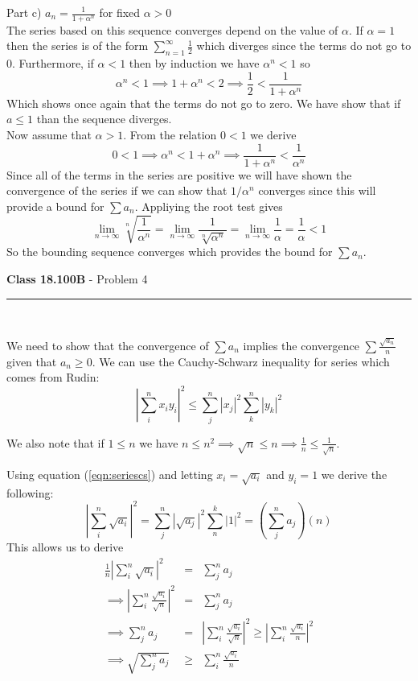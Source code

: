 \documentclass[11pt,reqno]{article}
\begin{document}
Part c) $a_n = \frac{1}{1+\alpha^n}$ for fixed $\alpha > 0$\\
The series based on this sequence converges depend on the value of $\alpha$. If $\alpha = 1$ then the series is of the form $\sum_{n = 1}^\infty \frac{1}{2}$ which diverges since the terms do not go to 0. Furthermore, if $\alpha < 1$ then by induction we have $\alpha^n < 1$ so 
\[ \alpha^n < 1 \implies 1+ \alpha^n < 2 \implies \frac{1}{2} < \frac{1}{1+\alpha^n} \]
Which shows once again that the terms do not go to zero. We have show that if $a \le 1$ than the sequence diverges. \\
\indent Now assume that $\alpha > 1$. From the relation $0 < 1$ we derive \[ 0 < 1 \implies \alpha^n < 1+ \alpha^n \implies \frac{1}{1+\alpha^n} < \frac{1}{\alpha^n} \]
Since all of the terms in the series are positive we will have shown the convergence of the series if we can show that $1/ \alpha^n$ converges since this will provide a bound for $\sum a_n$. Appliying the root test gives
\[ \lim_{n \to \infty} \sqrt[n]{\frac{1}{\alpha^n}} = \lim_{n \to \infty} \frac{1}{ \sqrt[n]{\alpha^n} } =  \lim_{n \to \infty} \frac{1}{\alpha} =  \frac{1}{\alpha} < 1 \]
So the bounding sequence converges which provides the bound for $\sum a_n$.


\newpage
\vspace{15pt}
\begin{flushleft} 
\textbf{Class 18.100B} - Problem 4\\
\rule{500pt}{1pt}\\
\end{flushleft} 

We need to show that the convergence of $\sum a_n$ implies the convergence $\sum \frac{\sqrt{a_n}}{n}$ given that $a_n \ge 0$. We can use the Cauchy-Schwarz inequality for series which comes from Rudin:
\begin{equation}
|\sum_i^n x_i y_i|^2 \le \sum_j^n | x_j |^2 \sum_k^n | y_k |^2 \label{eqn:seriescs}
\end{equation}

\noindent We also note that if $1 \le n$ we have $n \le n^2 \implies \sqrt{n} \le n \implies \frac{1}{n} \le \frac{1}{\sqrt{n}} $.

\noindent Using equation (\ref{eqn:seriescs}) and letting $x_i = \sqrt{a_i}$ and $y_i = 1$ we derive the following:
\[  | \sum_i^n \sqrt{a_i} |^2   = \sum_j^n | \sqrt{a_j} |^2 \sum_n^k | 1 |^2  = (\sum_j^n a_j)(n)  \]
This allows us to derive
\begin{eqnarray*}
 \frac{1}{n} | \sum_i^n \sqrt{a_i} |^2  &=& \sum_j^n a_j \\
 \implies  | \sum_i^n \frac{\sqrt{a_i}}{\sqrt{n}} |^2  &=& \sum_j^n a_j \\
 \implies \sum_j^n a_j &=& | \sum_i^n \frac{\sqrt{a_i}}{\sqrt{n}} |^2  \ge  | \sum_i^n \frac{\sqrt{a_i}}{n} |^2 \\
 \implies \sqrt{\sum_j^n a_j} &\ge& \sum_i^n \frac{\sqrt{a_i}}{n}
\end{eqnarray*}
\end{document}
